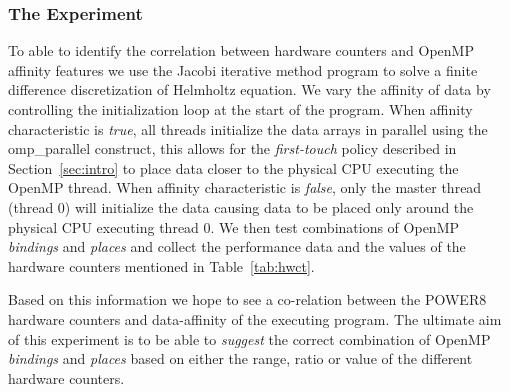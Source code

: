 \subsubsection{The Experiment}
To able to identify the correlation between hardware counters and OpenMP affinity features we use the Jacobi iterative method program to solve a 
finite difference discretization of Helmholtz equation. We vary the affinity of data by controlling the initialization loop at the start of the program. 
When affinity characteristic is \textit{true}, all threads initialize the data arrays in parallel using the omp\_parallel construct, this allows for the 
\textit{first-touch} policy described in Section~\ref{sec:intro} to place data closer to the physical CPU executing the OpenMP thread. When 
affinity characteristic is \textit{false}, only the master thread (thread 0) will initialize the data causing data to be placed only around the physical CPU executing thread 0. We then test combinations of OpenMP \textit{bindings} and \textit{places} and collect the performance data and the values of the hardware counters mentioned in Table~\ref{tab:hwct}.

Based on this information we hope to see a co-relation between the POWER8 hardware counters and data-affinity of the executing program. The 
ultimate aim of this experiment is to be able to \textit{suggest} the correct combination of OpenMP \textit{bindings} and \textit{places} based on 
either the range, ratio or value of the different hardware counters.